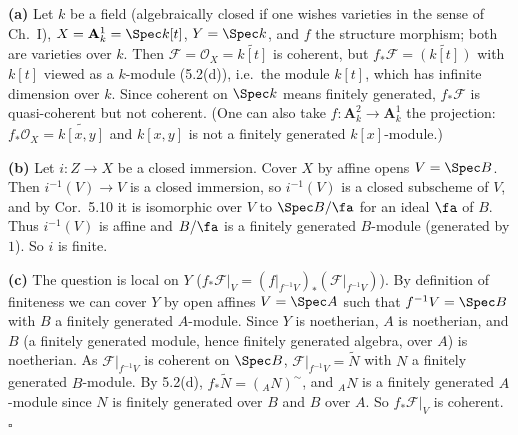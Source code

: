 \documentclass[11pt]{article}
\begin{document}
\pf
\textbf{(a)} Let $k$ be a field (algebraically closed if one wishes varieties in the sense of Ch.~I), $X=\mathbf A^1_k=\Spec k[t]$, $Y=\Spec k$, and $f$ the structure morphism; both are varieties over $k$. Then $\mathcal F=\mathcal O_X=\widetilde{k[t]}$ is coherent, but $f_*\mathcal F=\widetilde{(k[t])}$ with $k[t]$ viewed as a $k$-module (5.2(d)), i.e.\ the module $k[t]$, which has infinite dimension over $k$. Since coherent on $\Spec k$ means finitely generated, $f_*\mathcal F$ is quasi-coherent but not coherent. (One can also take $f:\mathbf A^2_k\to\mathbf A^1_k$ the projection: $f_*\mathcal O_X=\widetilde{k[x,y]}$ and $k[x,y]$ is not a finitely generated $k[x]$-module.)

\textbf{(b)} Let $i:Z\to X$ be a closed immersion. Cover $X$ by affine opens $V=\Spec B$. Then $i^{-1}(V)\to V$ is a closed immersion, so $i^{-1}(V)$ is a closed subscheme of $V$, and by Cor.~5.10 it is isomorphic over $V$ to $\Spec B/\fa$ for an ideal $\fa$ of $B$. Thus $i^{-1}(V)$ is affine and $B/\fa$ is a finitely generated $B$-module (generated by $1$). So $i$ is finite.

\textbf{(c)} The question is local on $Y$ ($f_*\mathcal F|_V=(f|_{f^{-1}V})_*(\mathcal F|_{f^{-1}V})$). By definition of finiteness we can cover $Y$ by open affines $V=\Spec A$ such that $f^{-1}V=\Spec B$ with $B$ a finitely generated $A$-module. Since $Y$ is noetherian, $A$ is noetherian, and $B$ (a finitely generated module, hence finitely generated algebra, over $A$) is noetherian. As $\mathcal F|_{f^{-1}V}$ is coherent on $\Spec B$, $\mathcal F|_{f^{-1}V}=\widetilde N$ with $N$ a finitely generated $B$-module. By 5.2(d), $f_*\widetilde N=({}_AN)^{\sim}$, and ${}_AN$ is a finitely generated $A$-module since $N$ is finitely generated over $B$ and $B$ over $A$. So $f_*\mathcal F|_V$ is coherent. \hfill$\square$
\end{document}
